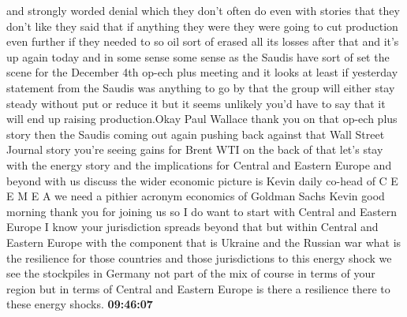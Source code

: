 \documentclass{article}%
\begin{document}
and strongly worded denial which they don't often do even with stories that they don't like they said that if anything they were they were going to cut production even further if they needed to so oil sort of erased all its losses after that and it's up again today and in some sense some sense as the Saudis have sort of set the scene for the December 4th op{-}ech plus meeting and it looks at least if yesterday statement from the Saudis was anything to go by that the group will either stay steady without put or reduce it but it seems unlikely you'd have to say that it will end up raising production.Okay Paul Wallace thank you on that op{-}ech plus story then the Saudis coming out again pushing back against that Wall Street Journal story you're seeing gains for Brent WTI on the back of that let's stay with the energy story and the implications for Central and Eastern Europe and beyond with us discuss the wider economic picture is Kevin daily co{-}head of C E E M E A we need a pithier acronym economics of Goldman Sachs Kevin good morning thank you for joining us so I do want to start with Central and Eastern Europe I know your jurisdiction spreads beyond that but within Central and Eastern Europe with the component that is Ukraine and the Russian war what is the resilience for those countries and those jurisdictions to this energy shock we see the stockpiles in Germany not part of the mix of course in terms of your region but in terms of Central and Eastern Europe is there a resilience there to these energy shocks.%
\textbf{09:46:07}%
\newline%
\end{document}
